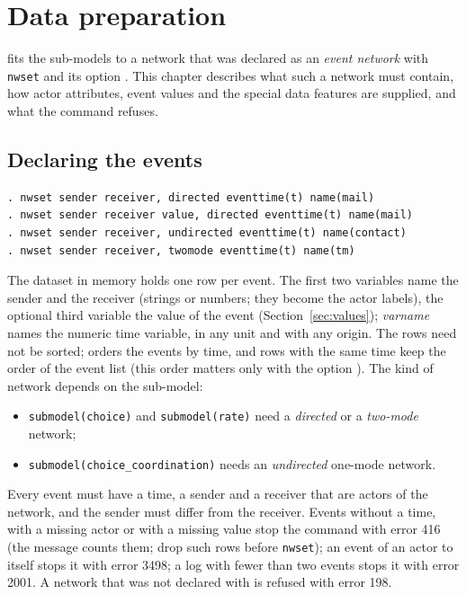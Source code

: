 \chapter{Data preparation}\label{ch:data}

\nwdynam{} fits the sub-models to a network that was declared as an \emph{event network} with \texttt{nwset} and its option . This chapter describes what such a network must contain, how actor attributes, event values and the special data features are supplied, and what the command refuses.

\section{Declaring the events}\label{sec:declare}

\begin{lstlisting}
. nwset sender receiver, directed eventtime(t) name(mail)
. nwset sender receiver value, directed eventtime(t) name(mail)
. nwset sender receiver, undirected eventtime(t) name(contact)
. nwset sender receiver, twomode eventtime(t) name(tm)
\end{lstlisting}
The dataset in memory holds one row per event. The first two variables name the sender and the receiver (strings or numbers; they become the actor labels), the optional third variable the value of the event (Section~\ref{sec:values}); \emph{varname}\opt{)} names the numeric time variable, in any unit and with any origin. The rows need not be sorted; \nwdynam{} orders the events by time, and rows with the same time keep the order of the event list (this order matters only with the option ). The kind of network depends on the sub-model:
\begin{itemize}[nosep]
  \item \texttt{submodel(choice)} and \texttt{submodel(rate)} need a \emph{directed} or a \emph{two-mode} network;
  \item \texttt{submodel(choice\_coordination)} needs an \emph{undirected} one-mode network.
\end{itemize}
Every event must have a time, a sender and a receiver that are actors of the network, and the sender must differ from the receiver. Events without a time, with a missing actor or with a missing value stop the command with error 416 (the message counts them; drop such rows before \texttt{nwset}); an event of an actor to itself stops it with error 3498; a log with fewer than two events stops it with error 2001. A network that was not declared with  is refused with error 198.

